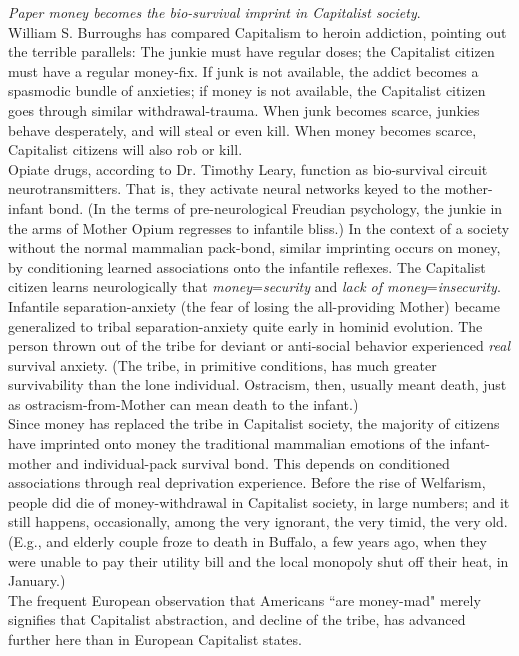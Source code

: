 \emph{Paper money becomes the bio-survival imprint in Capitalist society}.\\
William S. Burroughs has compared Capitalism to heroin addiction, pointing out the terrible parallels: The junkie must have regular doses; the Capitalist citizen must have a regular money-fix. If junk is not available, the addict becomes a spasmodic bundle of anxieties; if money is not available, the Capitalist citizen goes through similar withdrawal-trauma. When junk becomes scarce, junkies behave desperately, and will steal or even kill. When money becomes scarce, Capitalist citizens will also rob or kill.\\
Opiate drugs, according to Dr. Timothy Leary, function as bio-survival circuit neurotransmitters. That is, they activate neural networks keyed to the mother-infant bond. (In the terms of pre-neurological Freudian psychology, the junkie in the arms of Mother Opium regresses to infantile bliss.) In the context of a society without the normal mammalian pack-bond, similar imprinting occurs on money, by conditioning learned associations onto the infantile reflexes. The Capitalist citizen learns neurologically that \emph{money}=\emph{security} and \emph{lack of money}=\emph{insecurity}.\\
Infantile separation-anxiety (the fear of losing the all-providing Mother) became generalized to tribal separation-anxiety quite early in hominid evolution. The person thrown out of the tribe for deviant or anti-social behavior experienced \emph{real} survival anxiety. (The tribe, in primitive conditions, has much greater survivability than the lone individual. Ostracism, then, usually meant death, just as ostracism-from-Mother can mean death to the infant.)\\
Since money has replaced the tribe in Capitalist society, the majority of citizens have imprinted onto money the traditional mammalian emotions of the infant-mother and individual-pack survival bond. This depends on conditioned associations through real deprivation experience. Before the rise of Welfarism, people did die of money-withdrawal in Capitalist society, in large numbers; and it still happens, occasionally, among the very ignorant, the very timid, the very old. (E.g., and elderly couple froze to death in Buffalo, a few years ago, when they were unable to pay their utility bill and the local monopoly shut off their heat, in January.)\\
The frequent European observation that Americans ``are money-mad" merely signifies that Capitalist abstraction, and decline of the tribe, has advanced further here than in European Capitalist states.\\

